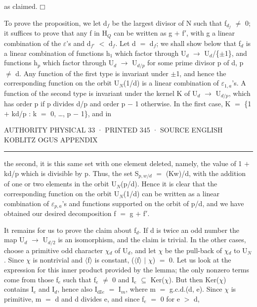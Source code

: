\documentclass[10pt,twoside]{article}
\newcommand{\PageUnit}[3]{%
  \par\noindent\hypertarget{record-#1}{}%
  \pdfbookmark[1]{Authority page #1 · printed #2}{bookmark-#1}%
  {\sffamily\footnotesize\color{D030Muted}AUTHORITY PHYSICAL #1 · PRINTED #2 · #3}%
  \par\vspace{0.35em}\hrule height 0.35pt\vspace{0.8em}}
\begin{document}
as claimed. \ensuremath{□}\par
To prove the proposition, we let d\ensuremath{_{f}} be the largest divisor of N such that f\ensuremath{_{d_f}} \ensuremath{≠} 0; it suffices to prove that any f in H\ensuremath{_{Q}} can be written as g \ensuremath{+} f\ensuremath{′}, with g a linear combination of the \ensuremath{ε}’s and d\ensuremath{_{f′}} \ensuremath{<} d\ensuremath{_{f}}. Let d \ensuremath{=} d\ensuremath{_{f}}; we shall show below that f\ensuremath{_{d}} is a linear combination of functions h\ensuremath{_{1}} which factor through U\ensuremath{_{d}} \ensuremath{→} U\ensuremath{_{d}}/\{\ensuremath{±}1\}, and functions h\ensuremath{_{p}} which factor through U\ensuremath{_{d}} \ensuremath{→} U\ensuremath{_{d/p}} for some prime divisor p of d, p \ensuremath{≠} d. Any function of the first type is invariant under \ensuremath{±}1, and hence the corresponding function on the orbit U\ensuremath{_{N}}(1/d) is a linear combination of \ensuremath{ε}\ensuremath{_{1,a}}’s. A function of the second type is invariant under the kernel K of U\ensuremath{_{d}} \ensuremath{→} U\ensuremath{_{d/p}}, which has order p if p divides d/p and order p \ensuremath{−} 1 otherwise. In the first case, K \ensuremath{=} \{1 \ensuremath{+} kd/p : k \ensuremath{=} 0, …, p \ensuremath{−} 1\}, and in\par
\clearpage
\PageUnit{33}{345}{SOURCE ENGLISH KOBLITZ OGUS APPENDIX}
the second, it is this same set with one element deleted, namely, the value of 1 \ensuremath{+} kd/p which is divisible by p. Thus, the set S\ensuremath{_{p,w/d}} \ensuremath{=} (Kw)/d, with the addition of one or two elements in the orbit U\ensuremath{_{N}}(p/d). Hence it is clear that the corresponding function on the orbit U\ensuremath{_{N}}(1/d) can be written as a linear combination of \ensuremath{ε}\ensuremath{_{p,a}}’s and functions supported on the orbit of p/d, and we have obtained our desired decomposition f \ensuremath{=} g \ensuremath{+} f\ensuremath{′}.\par
It remains for us to prove the claim about f\ensuremath{_{d}}. If d is twice an odd number the map U\ensuremath{_{d}} \ensuremath{→} U\ensuremath{_{d/2}} is an isomorphism, and the claim is trivial. In the other cases, choose a primitive odd character \ensuremath{χ}\ensuremath{_{d}} of U\ensuremath{_{d}}, and let \ensuremath{χ} be the pull-back of \ensuremath{χ}\ensuremath{_{d}} to U\ensuremath{_{N}}. Since \ensuremath{χ} is nontrivial and \ensuremath{⟨}f\ensuremath{⟩} is constant, (\ensuremath{⟨}f\ensuremath{⟩} \ensuremath{|} \ensuremath{χ}) \ensuremath{=} 0. Let us look at the expression for this inner product provided by the lemma; the only nonzero terms come from those f\ensuremath{_{e}} such that f\ensuremath{_{e}} \ensuremath{≠} 0 and I\ensuremath{_{e}} \ensuremath{⊆} Ker(\ensuremath{χ}). But then Ker(\ensuremath{χ}) contains I\ensuremath{_{e}} and I\ensuremath{_{d}}, hence also I\ensuremath{_{\mathrm{dI}}}\ensuremath{_{e}} \ensuremath{=} I\ensuremath{_{m}}, where m \ensuremath{=} g.c.d.(d, e). Since \ensuremath{χ} is primitive, m \ensuremath{=} d and d divides e, and since f\ensuremath{_{e}} \ensuremath{=} 0 for e \ensuremath{>} d,\par
\end{document}
